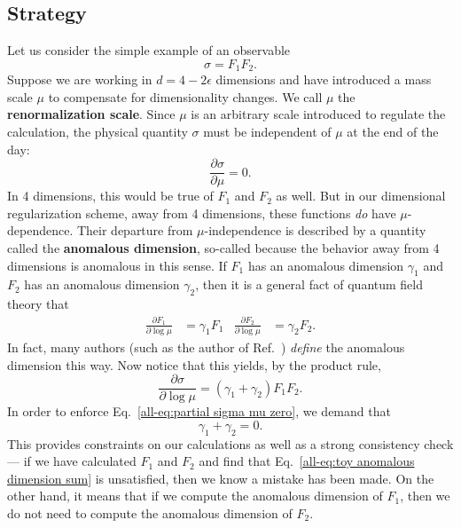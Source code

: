 \documentclass[../thesis.tex]{subfiles}
\begin{document}
\subsection{Strategy}
	Let us consider the simple example of an observable
	\begin{equation}
		\sigma = F_1 F_2.
	\end{equation}
	Suppose we are working in $d = 4 - 2\epsilon$ dimensions and have introduced a mass scale $\mu$ to compensate for dimensionality changes. We call $\mu$ the \textbf{renormalization scale}. Since $\mu$ is an arbitrary scale introduced to regulate the calculation, the physical quantity $\sigma$ must be independent of $\mu$ at the end of the day:
	\begin{equation}\label{all-eq:partial sigma mu zero}
		\frac{\partial \sigma}{\partial \mu} = 0.
	\end{equation}
	In 4 dimensions, this would be true of $F_1$ and $F_2$ as well. But in our dimensional regularization scheme, away from 4 dimensions, these functions \textit{do} have $\mu$-dependence. Their departure from $\mu$-independence is described by a quantity called the \textbf{anomalous dimension}, so-called because the behavior away from 4 dimensions is anomalous in this sense. If $F_1$ has an anomalous dimension $\gamma_1$ and $F_2$ has an anomalous dimension $\gamma_2$, then it is a general fact of quantum field theory that \cite{schwartz_quantum_2014}
	\begin{align}\label{all-eq:toy RGE}
		\frac{\partial F_1}{\partial \log \mu} &= \gamma_1 F_1 & \frac{\partial F_2}{\partial \log \mu} &= \gamma_2 F_2.
	\end{align}
	In fact, many authors (such as the author of Ref.~\cite{schwartz_quantum_2014}) \textit{define} the anomalous dimension this way. Now notice that this yields, by the product rule,
	\begin{equation}
		\frac{\partial \sigma}{\partial \log \mu} = (\gamma_1 + \gamma_2) F_1 F_2.
	\end{equation}
	In order to enforce Eq.~\ref{all-eq:partial sigma mu zero}, we demand that
	\begin{equation}\label{all-eq:toy anomalous dimension sum}
		\gamma_1 + \gamma_2 = 0.
	\end{equation}
	This provides constraints on our calculations as well as a strong consistency check --- if we have calculated $F_1$ and $F_2$ and find that Eq.~\ref{all-eq:toy anomalous dimension sum} is unsatisfied, then we know a mistake has been made. On the other hand, it means that if we compute the anomalous dimension of $F_1$, then we do not need to compute the anomalous dimension of $F_2$.
\end{document}
